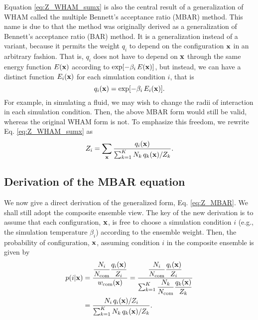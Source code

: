 \documentclass[aip,jcp,preprint,superscriptaddress]{revtex4-1}
\begin{document}
Equation \eqref{eq:Z_WHAM_sumx}
is also the central result of
a generalization of WHAM called
the multiple Bennett's acceptance ratio (MBAR) method\cite{shirts2008}.
%
This name is due to that the method
was originally derived as a generalization of
Bennett's acceptance ratio (BAR) method\cite{bennett1976}.
%
It is a generalization
instead of a variant, because it permits
the weight $q_i$ to depend on the configuration $\mathbf{x}$
in an arbitrary fashion.
%
That is, $q_i$ does not have to depend on $\mathbf{x}$
through the same energy function $E(\mathbf{x})$ according to
$\exp[-\beta_i \, E(\mathbf{x})]$,
but instead,
we can have a distinct function $E_i(\mathbf{x})$
for each simulation condition $i$, that is
\[
  q_i(\mathbf{x}) = \exp[-\beta_i \, E_i(\mathbf{x})].
\]
%
For example,
in simulating a fluid,
we may wish to change the radii of interaction
in each simulation condition.
%
Then, the above MBAR form would still be valid,
whereas the original WHAM form is not.
%
To emphasize this freedom,
we rewrite Eq. \eqref{eq:Z_WHAM_sumx} as
\begin{equation}
  Z_i
  =
  \sum_{\mathbf{x}}
  \frac{ q_i(\mathbf{x}) }
  { \sum_{k = 1}^K N_k \, q_k(\mathbf{x}) / Z_k }.
  \label{eq:Z_MBAR}
\end{equation}



\subsection{Derivation of the MBAR equation}



We now give a direct derivation
of the generalized form, Eq. \eqref{eq:Z_MBAR}.
%
We shall still adopt the composite ensemble view.
%
The key of the new derivation is to assume that
each configuration, $\mathbf{x}$, is free to choose
a simulation condition $i$ (e.g., the simulation temperature $\beta_i$)
according to the ensemble weight.
%
Then, the probability of configuration, $\mathbf{x}$,
assuming condition $i$ in the composite ensemble
is given by
%
\begin{align}
  p(i|\mathbf{x})
  &=
  \frac{ \dfrac{N_i}{N_{\mathrm{com}}} \dfrac{q_i(\mathbf{x})}{Z_i} }
  { w_{\mathrm{com}}(\mathbf{x}) }
  =
  \frac{ \dfrac{N_i}{N_{\mathrm{com}}} \dfrac{q_i(\mathbf{x})}{Z_i} }
  { \sum_{k = 1}^K \dfrac{N_k}{N_{\mathrm{com}}} \dfrac{q_k(\mathbf{x})}{Z_k} }
  \notag \\
  &=
  \frac{ N_i \, q_i(\mathbf{x}) / Z_i }
  { \sum_{k = 1}^K N_k \, q_k(\mathbf{x}) / Z_k }.
  \label{eq:pix_MBAR}
\end{align}
\end{document}
